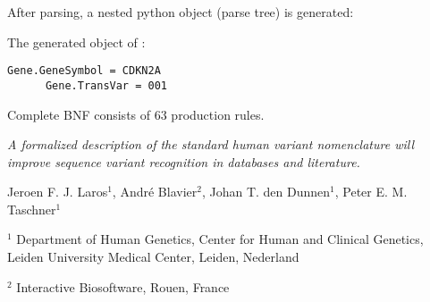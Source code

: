 \documentclass[slidestop]{beamer}
\begin{document}
\begin{frame}[fragile]
  After parsing, a nested python object (parse tree) is generated:
  \bigskip
  \pause

  The generated object of :
  \begin{lstlisting}[caption = {Python object}]
      Gene.GeneSymbol = CDKN2A
      Gene.TransVar = 001
  \end{lstlisting}
  \bigskip
  \pause

  Complete BNF consists of $63$ production rules.
  \bigskip
  \medskip
  \pause

  \emph{
    A formalized description of the standard human variant nomenclature will
    improve sequence variant recognition in databases and literature.
  }
  \vspace{0.1cm}

  \scriptsize{
    Jeroen F. J. Laros$^1$, Andr\'e Blavier$^2$, Johan T. den Dunnen$^1$,
    Peter E. M. Taschner$^1$
  }
  \vspace{0.1cm}

  \tiny{
    $^1$ Department of Human Genetics, Center for Human and Clinical Genetics,
    Leiden University Medical Center, Leiden, Nederland
    \vspace{-0.2cm}

    $^2$ Interactive Biosoftware, Rouen, France
  }
\end{frame}
\end{document}
